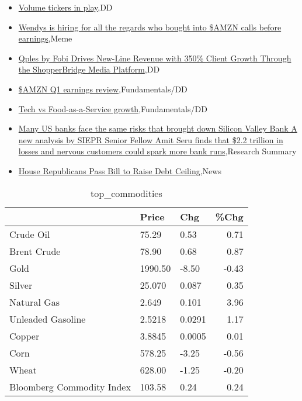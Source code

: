 \documentclass{article}%
\begin{document}
%
\begin{itemize}%
\item%
\href{https://reddit.com/r/wallstreetbets/comments/131q61y/volume\_tickers\_in\_play/}{Volume tickers in play},DD%
\item%
\href{https://reddit.com/r/wallstreetbets/comments/131p29y/wendys\_is\_hiring\_for\_all\_the\_regards\_who\_bought/}{Wendys is hiring for all the regards who bought into \$AMZN calls before earnings},Meme%
\item%
\href{https://reddit.com/r/Baystreetbets/comments/130mfli/qples\_by\_fobi\_drives\_newline\_revenue\_with\_350/}{Qples by Fobi Drives New-Line Revenue with 350\% Client Growth Through the ShopperBridge Media Platform},DD%
\item%
\href{https://reddit.com/r/StockMarket/comments/131qp9l/amzn\_q1\_earnings\_review/}{\$AMZN Q1 earnings review},Fundamentals/DD%
\item%
\href{https://reddit.com/r/StockMarket/comments/131l8va/tech\_vs\_foodasaservice\_growth/}{Tech vs Food-as-a-Service growth},Fundamentals/DD%
\item%
\href{https://reddit.com/r/Economics/comments/131epm3/many\_us\_banks\_face\_the\_same\_risks\_that\_brought/}{Many US banks face the same risks that brought down Silicon Valley Bank  A new analysis by SIEPR Senior Fellow Amit Seru finds that \$2.2 trillion in losses and nervous customers could spark more bank runs},Research Summary%
\item%
\href{https://reddit.com/r/Economics/comments/1317g7k/house\_republicans\_pass\_bill\_to\_raise\_debt\_ceiling/}{House Republicans Pass Bill to Raise Debt Ceiling},News%
\end{itemize}%


\begin{table}[htbp]%
\caption{top\_commodities}%
\centering%
\begin{adjustbox}{width=1\textwidth}%
\begin{tabular}{lllr}
\toprule
                          &   Price &    Chg &  \%Chg \\
\midrule
               Crude Oil  &   75.29 &   0.53 &  0.71 \\
             Brent Crude  &   78.90 &   0.68 &  0.87 \\
                    Gold  & 1990.50 &  -8.50 & -0.43 \\
                  Silver  &  25.070 &  0.087 &  0.35 \\
             Natural Gas  &   2.649 &  0.101 &  3.96 \\
       Unleaded Gasoline  &  2.5218 & 0.0291 &  1.17 \\
                  Copper  &  3.8845 & 0.0005 &  0.01 \\
                    Corn  &  578.25 &  -3.25 & -0.56 \\
                   Wheat  &  628.00 &  -1.25 & -0.20 \\
Bloomberg Commodity Index &  103.58 &   0.24 &  0.24 \\
\bottomrule
\end{tabular}
%
\end{adjustbox}%
\end{table}
\end{document}
